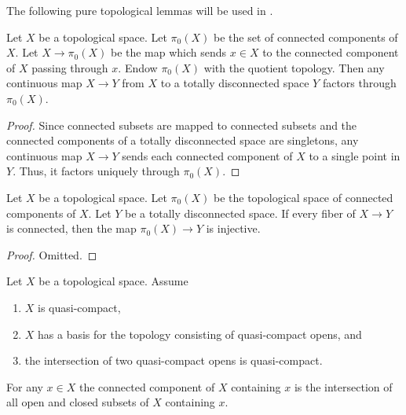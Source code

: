 The following pure topological lemmas will be used in .

\begin{lemma}
  \label{thm:pi0-to-totally-disconnected}
  Let \(X\) be a topological space. Let \(\pi_0(X)\) be the set of connected components of \(X\). Let \(X \to \pi_0(X)\) be the map which sends \(x \in X\) to the connected component of \(X\) passing through \(x\). Endow \(\pi_0(X)\) with the quotient topology. Then %
  any continuous map \(X \to Y\) from \(X\) to a totally disconnected space \(Y\) factors through \(\pi_0(X)\).
\end{lemma}

\begin{proof}
  Since connected subsets are mapped to connected subsets and the connected components of a totally disconnected space are singletons, any continuous map \(X \to Y\) sends each connected component of \(X\) to a single point in \(Y\). Thus, it factors uniquely through \(\pi_0(X)\).
\end{proof}

\begin{lemma}
  \label{thm:pi0-to-totally-disconnected-injective}
  Let \(X\) be a topological space. Let \(\pi_0(X)\) be the topological space of connected components of \(X\). Let \(Y\) be a totally disconnected space. If every fiber of \(X \to Y\) is connected, then the map \(\pi_0(X) \to Y\) is injective.
\end{lemma}

\begin{proof}
  Omitted.
\end{proof}

\begin{lemma}
  \label{thm:connected-component-intersection-closed-open}
  Let $X$ be a topological space. Assume
  \begin{enumerate}
    \item $X$ is quasi-compact,
    \item $X$ has a basis for the topology consisting of quasi-compact opens, and
    \item the intersection of two quasi-compact opens is quasi-compact.
  \end{enumerate}
  For any $x \in X$ the connected component of $X$ containing $x$ is the intersection of all open and closed subsets of $X$ containing $x$.
\end{lemma}

